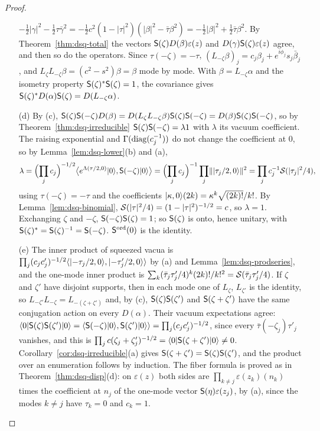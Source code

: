 \begin{veteenv}
\begin{proof}
\begin{enumerate}
$-\frac12\lvert\gamma\rvert^2-\frac12\tau\bar\gamma^2=-\frac12c^2(1-\lvert\tau\rvert^2)(\lvert\beta\rvert^2-\bar\tau\beta^2)=
-\frac12\lvert\beta\rvert^2+\frac12\bar\tau\beta^2$. By Theorem~\ref{thm:dsq-total} the vectors $\sS(\zeta)D(\beta)\varepsilon(z)$ and
$D(\gamma)\sS(\zeta)\varepsilon(z)$ agree, and then so do the operators. Since $\tau(-\zeta)=-\tau$, $(L_{-\zeta}\beta)_j=c_j\beta_j+
e^{i\phi_j}s_j\bar\beta_j$, and $L_\zeta L_{-\zeta}\beta=(c^2-s^2)\beta=\beta$ mode by mode. With $\beta=L_{-\zeta}\alpha$ and the
isometry property $\sS(\zeta)^*\sS(\zeta)=1$, the covariance gives $\sS(\zeta)^*D(\alpha)\sS(\zeta)=D(L_{-\zeta}\alpha)$.
\item[(d)] By (c), $\mathsf S(\zeta)\mathsf S(-\zeta)D(\beta)=D(L_\zeta L_{-\zeta}\beta)\mathsf S(\zeta)\mathsf S(-\zeta)=D(\beta)\mathsf S(\zeta)\mathsf S(-\zeta)$, so by
Theorem~\ref{thm:dsq-irreducible} $\mathsf S(\zeta)\mathsf S(-\zeta)=\lambda1$ with $\lambda$ its vacuum coefficient. The raising exponential and
$\Gamma(\operatorname{diag}(c_j^{-1}))$ do not change the coefficient at $0$, so by Lemma~\ref{lem:dsq-lower}(b) and (a),
\[
 \lambda=\Bigl(\prod_jc_j\Bigr)^{-1/2}\bigl\langle e^{\Lambda(\tau/2,0)}\lvert 0\rangle,\mathsf S(-\zeta)\lvert 0\rangle\bigr\rangle
 =\Bigl(\prod_jc_j\Bigr)^{-1}\prod_j\lVert\lvert \tau_j/2,0\rangle\rVert^2=\prod_jc_j^{-1}\mathcal S(\lvert\tau_j\rvert^2/4),
\]
using $\tau(-\zeta)=-\tau$ and the coefficients $\lvert \kappa,0\rangle(2k)=\kappa^k\sqrt{(2k)!}/k!$. By Lemma~\ref{lem:dsq-binomial},
$\mathcal S(\lvert\tau\rvert^2/4)=(1-\lvert\tau\rvert^2)^{-1/2}=c$, so $\lambda=1$. Exchanging $\zeta$ and $-\zeta$, $\mathsf S(-\zeta)\mathsf S(\zeta)=1$; so
$\mathsf S(\zeta)$ is onto, hence unitary, with $\mathsf S(\zeta)^*=\mathsf S(\zeta)^{-1}=\mathsf S(-\zeta)$. $\mathsf S^{\mathrm{ord}}(0)$ is the identity.
\item[(e)] The inner product of squeezed vacua is $\prod_j(c_jc'_j)^{-1/2}\langle\lvert -\tau_j/2,0\rangle,\lvert -\tau'_j/2,0\rangle\rangle$ by (a)
and Lemma~\ref{lem:dsq-prodseries}, and the one-mode inner product is $\sum_k(\bar\tau_j\tau'_j/4)^k(2k)!/k!^2=\mathcal S(\bar\tau_j\tau'_j/4)$.
If $\zeta$ and $\zeta'$ have disjoint supports, then in each mode one of $L_\zeta$, $L_{\zeta'}$ is the identity, so
$L_{-\zeta'}L_{-\zeta}=L_{-(\zeta+\zeta')}$ and, by (c), $\mathsf S(\zeta)\mathsf S(\zeta')$ and $\mathsf S(\zeta+\zeta')$ have the same conjugation
action on every $D(\alpha)$. Their vacuum expectations agree: $\langle0\rvert\mathsf S(\zeta)\mathsf S(\zeta')\lvert 0\rangle=\langle\mathsf S(-\zeta)\lvert 0\rangle,
\mathsf S(\zeta')\lvert 0\rangle\rangle=\prod_j(c_jc'_j)^{-1/2}$, since every $\bar\tau(-\zeta_j)\tau'_j$ vanishes, and this is
$\prod_jc(\zeta_j+\zeta'_j)^{-1/2}=\langle0\rvert\mathsf S(\zeta+\zeta')\lvert 0\rangle\ne0$. Corollary~\ref{cor:dsq-irreducible}(a) gives
$\mathsf S(\zeta+\zeta')=\mathsf S(\zeta)\mathsf S(\zeta')$, and the product over an enumeration follows by induction. The fiber formula is proved as in
Theorem~\ref{thm:dsq-disp}(d): on $\varepsilon(z)$ both sides are $\prod_{k\ne j}\varepsilon(z_k)(n_k)$ times the coefficient at $n_j$
of the one-mode vector $\mathsf S(\eta)\varepsilon(z_j)$, by (a), since the modes $k\ne j$ have $\tau_k=0$ and $c_k=1$.\qedhere
\end{enumerate}
\end{proof}


\end{veteenv}
